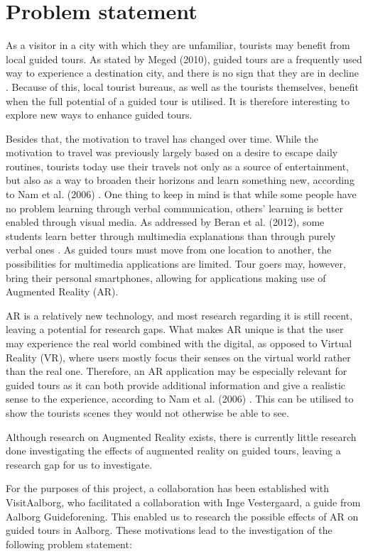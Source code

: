 \chapter{Problem statement}\label{ch:problemstatement}
As a visitor in a city with which they are unfamiliar, tourists may benefit from local guided tours. As stated by Meged (2010), guided tours are a frequently used way to experience a destination city, and there is no sign that they are in decline \cite{Meged2010}. Because of this, local tourist bureaus, as well as the tourists themselves, benefit when the full potential of a guided tour is utilised. It is therefore interesting to explore new ways to enhance guided tours. 

Besides that, the motivation to travel has changed over time. While the motivation to travel was previously largely based on a desire to escape daily routines, tourists today use their travels not only as a source of entertainment, but also as a way to broaden their horizons and learn something new, according to Nam et al. (2006) \cite{Nam2006}. One thing to keep in mind is that while some people have no problem learning through verbal communication, others’ learning is better enabled through visual media. As addressed by Beran et al. (2012), some students learn better through multimedia explanations than through purely verbal ones \cite{Beran2012}. As guided tours must move from one location to another, the possibilities for multimedia applications are limited. Tour goers may, however, bring their personal smartphones, allowing for applications making use of Augmented Reality (AR).

AR is a relatively new technology, and most research regarding it is still recent, leaving a potential for research gaps. What makes AR unique is that the user may experience the real world combined with the digital, as opposed to Virtual Reality (VR), where users mostly focus their senses on the virtual world rather than the real one. Therefore, an AR application may be especially relevant for guided tours as it can both provide additional information and give a realistic sense to the experience, according to Nam et al. (2006) \cite{Nam2006}. This can be utilised to show the tourists scenes they would not otherwise be able to see.

Although research on Augmented Reality exists, there is currently little research done investigating the effects of augmented reality on guided tours, leaving a research gap for us to investigate.

For the purposes of this project, a collaboration has been established with VisitAalborg, who facilitated a collaboration with Inge Vestergaard, a guide from Aalborg Guideforening. This enabled us to research the possible effects of AR on guided tours in Aalborg. These motivations lead to the investigation of the following problem statement:

